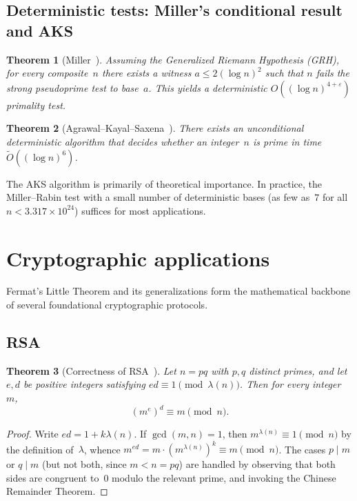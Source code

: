 \documentclass[12pt]{amsart}
\theoremstyle{plain}
\newtheorem{theorem}{Theorem}[section]
\theoremstyle{definition}
\theoremstyle{remark}
\begin{document}
\subsection{Deterministic tests: Miller's conditional result and AKS}

\begin{theorem}[Miller~\cite{miller1976}]\label{thm:miller_grh}
Assuming the Generalized Riemann Hypothesis (GRH), for every
composite~$n$ there exists a witness $a\le 2(\log n)^{2}$ such that
$n$ fails the strong pseudoprime test to base~$a$.  This yields a
deterministic $O((\log n)^{4+\varepsilon})$ primality test.
\end{theorem}

\begin{theorem}[Agrawal--Kayal--Saxena~\cite{aks2004}]
\label{thm:aks}
There exists an unconditional deterministic algorithm that decides
whether an integer~$n$ is prime in time
$\widetilde{O}((\log n)^{6})$.
\end{theorem}

The AKS algorithm is primarily of theoretical importance.  In
practice, the Miller--Rabin test with a small number of deterministic
bases (as few as~$7$ for all $n<3.317\times 10^{24}$) suffices for
most applications.

\section{Cryptographic applications}\label{sec:crypto}

Fermat's Little Theorem and its generalizations form the mathematical
backbone of several foundational cryptographic protocols.

\subsection{RSA}\label{subsec:rsa}

\begin{theorem}[Correctness of RSA~\cite{rsa1978}]
\label{thm:rsa}
Let $n=pq$ with $p,q$ distinct primes, and let $e,d$ be positive
integers satisfying $ed\equiv 1\pmod{\lambda(n)}$.  Then for every
integer~$m$,
\[
  (m^{e})^{d} \equiv m \pmod{n}.
\]
\end{theorem}

\begin{proof}
Write $ed=1+k\lambda(n)$.  If $\gcd(m,n)=1$, then $m^{\lambda(n)}
\equiv 1\pmod{n}$ by the definition of~$\lambda$, whence
$m^{ed}=m\cdot(m^{\lambda(n)})^{k}\equiv m\pmod{n}$.  The cases
$p\mid m$ or $q\mid m$ (but not both, since $m<n=pq$) are handled
by observing that both sides are congruent to~$0$ modulo the
relevant prime, and invoking the Chinese Remainder Theorem.
\end{proof}
\end{document}
